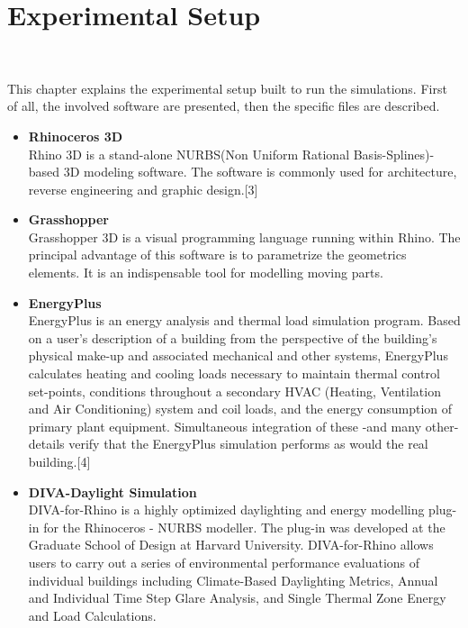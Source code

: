 
\chapter{Experimental Setup}\

This chapter explains the experimental setup built to run the simulations. First of all, the involved software are presented, then the specific files are described.\\
\begin{itemize}
\item{\textbf{Rhinoceros 3D\\}}
Rhino 3D is a stand-alone NURBS(Non Uniform Rational Basis-Splines)-based 3D modeling software. The software is commonly used for architecture, reverse engineering and graphic design.[3]

\item{\textbf{Grasshopper\\}}
Grasshopper 3D is a visual programming language running within Rhino. The principal advantage of this software is to parametrize the geometrics elements. It is an indispensable tool for modelling moving parts.

\item{\textbf{EnergyPlus\\}}
EnergyPlus is an energy analysis and thermal load simulation program. Based on a user's description of a building from the perspective of the building's physical make-up and associated mechanical and other systems, EnergyPlus calculates heating and cooling loads necessary to maintain thermal control set-points, conditions throughout a secondary HVAC (Heating, Ventilation and Air Conditioning) system and coil loads, and the energy consumption of primary plant equipment. Simultaneous integration of these -and many other- details verify that the EnergyPlus simulation performs as would the real building.[4]

\newpage

\item{\textbf{DIVA-Daylight Simulation\\}}
DIVA-for-Rhino is a highly optimized daylighting and energy modelling plug-in for the Rhinoceros - NURBS modeller. The plug-in was developed at the Graduate School of Design at Harvard University. DIVA-for-Rhino allows users to carry out a series of environmental performance evaluations of individual buildings  including Climate-Based Daylighting Metrics, Annual and Individual Time Step Glare Analysis, and Single Thermal Zone Energy and Load Calculations.
\end{itemize}

